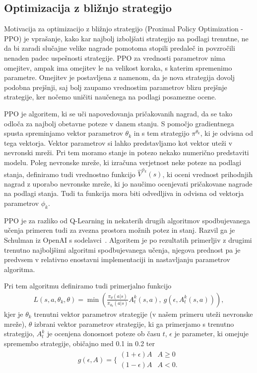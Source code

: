 \subsection{Optimizacija z bližnjo strategijo}

Motivacija za optimizacijo z bližnjo strategijo (Proximal Policy Optimization - PPO) je vprašanje, kako kar najbolj izboljšati strategijo na podlagi trenutne, ne da bi zaradi slučajne velike nagrade pomotoma stopili predaleč in povzročili nenaden padec uspešnosti strategije. PPO za vrednosti parametrov nima omejitev, ampak ima omejitev le na velikost koraka, s katerim spremenimo parametre. Omejitev je postavljena z namenom, da je nova strategija dovolj podobna prejšnji, saj bolj zaupamo vrednostim parametrov blizu prejšnje strategije, ker nočemo uničiti naučenega na podlagi posamezne ocene.

PPO je algoritem, ki se uči napovedovanja pričakovanih nagrad, da se tako odloča za najbolj obetavne poteze v danem stanju. S pomočjo gradientnega spusta spreminjamo vektor parametrov $\theta_k$ in s tem strategijo $\pi^{\theta_k}$, ki je odvisna od tega vektorja. Vektor parametrov si lahko predstavljamo kot vektor uteži v nevronski mreži. Pri tem moramo stanje in potezo nekako numerično predstaviti modelu. Poleg nevronske mreže, ki izračuna verjetnost neke poteze na podlagi stanja, definiramo tudi vrednostno funkcijo $\hat{V}^{\phi_k}(s)$, ki oceni vrednost prihodnjih nagrad z uporabo nevronske mreže, ki jo naučimo ocenjevati pričakovane nagrade na podlagi stanja. Tudi ta funkcija mora biti odvedljiva in odvisna od vektorja parametrov $\phi_k$. 

PPO je za razliko od Q-Learning in nekaterih drugih algoritmov spodbujevanega učenja primeren tudi za zvezna prostora možnih potez in stanj. Razvil ga je Schulman iz OpenAI s sodelavci~\cite{ppo-clanek}. Algoritem je po rezultatih primerljiv z drugimi trenutno najboljšimi algoritmi spodbujevanega učenja, njegova prednost pa je predvsem v relativno enostavni implementaciji in nastavljanju parametrov algoritma.

Pri tem algoritmu definiramo tudi primerjalno funkcijo
\begin{align}
L(s,a,\theta_k,\theta) = \min\left(\frac{\pi_{\theta}(a|s)}{\pi_{\theta_k}(a|s)}  A_t^k(s,a),~g(\epsilon, A_t^k(s,a))\right), \label{eq:lclip}
\end{align}
kjer je $\theta_k$ trenutni vektor parametrov strategije (v našem primeru uteži nevronske mreže), $\theta$ izbrani vektor parametrov strategije, ki ga primerjamo s trenutno strategijo, $A_t^k$ je ocenjena donosnost poteze ob času $t$, $\epsilon$ je parameter, ki omejuje spremembo strategije, običajno med 0.1 in 0.2 ter
\begin{align}
g(\epsilon, A) = \Big\{
\begin{array}{ll}
(1 + \epsilon) A & A \geq 0 \\
(1 - \epsilon) A & A < 0.
\end{array}
\end{align}

